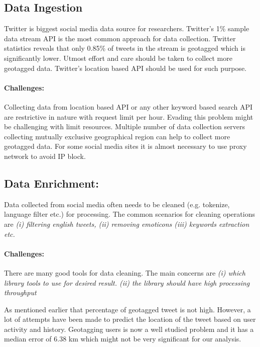 \subsection{Data Ingestion}
Twitter is biggest social media data source for researchers. Twitter's 1\% sample data stream API is the most common approach for data collection. Twitter statistics reveals that only 0.85\% of tweets in the stream is geotagged \cite{sloan2013knowing} which is significantly lower. Utmost effort and care should be taken to collect more geotagged data. Twitter's location based API should be used for such purpose.

\paragraph{Challenges:}
Collecting data from location based API or any other keyword based search API are restrictive in nature with request limit per hour.
Evading this problem might be challenging with limit resources. Multiple number of data collection servers collecting mutually exclusive geographical region can help to collect more geotagged data. For some social media sites it is almost necessary to use proxy network to avoid IP block.

\subsection{Data Enrichment:}
Data collected from social media often needs to be cleaned (e.g. tokenize, language filter etc.) for processing. The common scenarios for cleaning operations are {\em(i) filtering english tweets, (ii) removing emoticons (iii) keywords extraction etc. }

\vspace{-2mm}
\paragraph{Challenges:} There are many good tools for data cleaning. The main concerns are {\em(i) which library tools to use for desired result. (ii) the library should have high processing throughput}

As mentioned earlier that percentage of geotagged tweet is not high. However, a lot of attempts have been made to predict the location of the tweet based on user activity and history.  Geotagging users is now a well studied problem and it has a median error of 6.38 km which might not be very significant for our analysis\cite{compton2014geotagging}.

